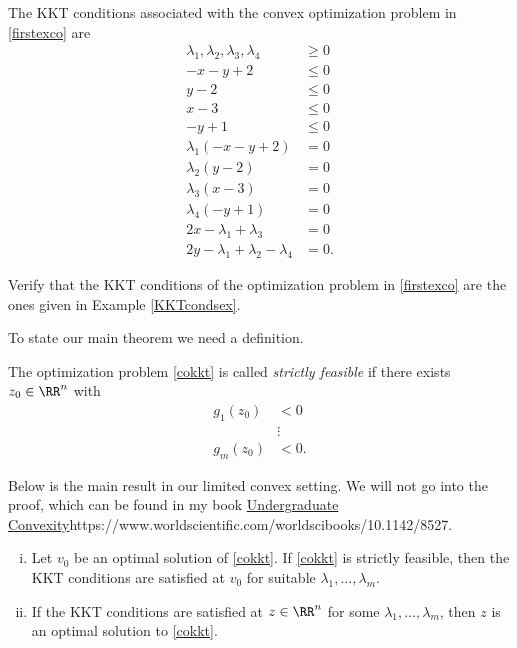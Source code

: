 \documentclass{article}
\begin{document}
  \begin{example}\label{KKTcondsex}
    The KKT conditions associated with the convex optimization problem in \eqref{firstexco} are
    \begin{align*}
      \lambda_1, \lambda_2, \lambda_3, \lambda_4 & \geq 0\\
 -x -y + 2 &\leq 0\\
  y - 2&\leq 0\\
  x - 3&\leq 0\\
  -y + 1 &\leq 0\\
  \lambda_1 (- x - y + 2) &=0\\
  \lambda_2 (y - 2) &= 0\\
  \lambda_3 (x - 3) &= 0\\
  \lambda_4 (-y + 1) &= 0\\
  2 x - \lambda_1  + \lambda_3 &= 0\\
  2 y - \lambda_1  + \lambda_2 -\lambda_4 &= 0.
\end{align*}
    
  \end{example}

  \beginshex
  Verify that the KKT conditions of the optimization problem in \eqref{firstexco} are the
  ones given in Example \ref{KKTcondsex}.
  \endshex

To state our main theorem we
  need a definition.

\begin{definition}[emph]
  The optimization problem \eqref{cokkt} is called \emph{strictly
    feasible} if there exists $z_0\in \RR^n$ with
  \begin{align*}
    g_1(z_0) &< 0\\
    &\vdots\\
    g_m(z_0) &< 0.
  \end{align*}
\end{definition}

Below is the main result in our limited convex setting. We will not go into the proof, which can be found in my book \url{Undergraduate Convexity}{https://www.worldscientific.com/worldscibooks/10.1142/8527}.

\begin{theorem}[emph]\label{thmKKT}
\begin{enumerate}[(i)]
\item
  Let $v_0$ be an optimal solution of \eqref{cokkt}. If \eqref{cokkt}
  is strictly feasible, then the KKT conditions are satisfied at $v_0$
  for suitable $\lambda_1, \dots, \lambda_m$.
\item
  If the KKT conditions are satisfied at $z\in \RR^n$ for some
  $\lambda_1, \dots, \lambda_m$, then $z$ is an optimal solution to
  \eqref{cokkt}.
  \end{enumerate}
\end{theorem}
\end{document}

